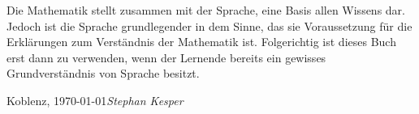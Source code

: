 \preface

Die Mathematik stellt zusammen mit der Sprache, eine Basis allen Wissens dar. Jedoch ist die Sprache grundlegender in dem Sinne, das sie Voraussetzung für die Erklärungen zum Verständnis der Mathematik ist. Folgerichtig ist dieses Buch erst dann zu verwenden, wenn der Lernende bereits ein gewisses Grundverständnis von Sprache besitzt. 

\vspace{\baselineskip}
\begin{flushright}\noindent
Koblenz, \today \hfill {\it Stephan Kesper}
\end{flushright}


